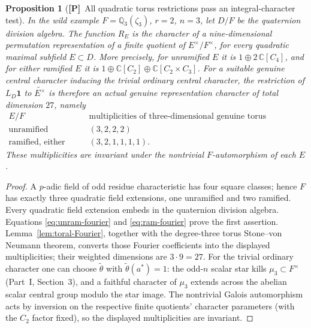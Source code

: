 \documentclass[11pt]{article}
\newcommand{\Q}{\mathbb Q}
\newcommand{\tth}{\widetilde\theta}
\newcommand{\Ptag}{\textnormal{\textbf{[P]}}}
\theoremstyle{plain}
\newtheorem{proposition}[theorem]{Proposition}
\theoremstyle{definition}
\begin{document}
\begin{proposition}[\Ptag\ All quadratic torus restrictions pass
an integral-character test]\label{prop:all-three-tori}
In the wild example $F=\Q_3(\zeta_3)$, $r=2$, $n=3$,
let $D/F$ be the quaternion division algebra.  The function
$R_E$ is the character of a nine-dimensional permutation
representation of a finite quotient of $E^\times/F^\times$,
for every quadratic maximal subfield $E\subset D$.
More precisely, for unramified $E$ it is
$1\oplus 2\,\mathbb C[C_4]$, and for either ramified $E$
it is $1\oplus\mathbb C[C_2]\oplus\mathbb C[C_2\times C_3]$.
For a suitable genuine central character inducing the trivial
ordinary central character, the restriction of $L_D\mathbf1$
to $\widetilde{E^\times}$ is therefore an \emph{actual genuine
representation character} of total dimension $27$, namely
\[
 \begin{array}{c|c}
 E/F&\text{multiplicities of three-dimensional genuine torus irreducibles}\\\hline
 \text{unramified}&(3,2,2,2)\\
 \text{ramified, either type}&(3,2,1,1,1,1).
 \end{array}
\]
These multiplicities are invariant under the nontrivial
$F$-automorphism of each $E$.
\end{proposition}
\begin{proof}
A $p$-adic field of odd residue characteristic has four
square classes; hence $F$ has exactly three quadratic field
extensions, one unramified and two ramified.  Every quadratic
field extension embeds in the quaternion division algebra.
Equations \eqref{eq:unram-fourier} and \eqref{eq:ram-fourier}
prove the first assertion.  Lemma~\ref{lem:toral-Fourier},
together with the degree-three torus Stone--von Neumann theorem,
converts those Fourier coefficients into the displayed
multiplicities; their weighted dimensions are $3\cdot9=27$.
For the trivial ordinary character one can choose
$\tth$ with $\tth(a^*)=1$:
the odd-$n$ scalar star kills $\mu_3\subset F^\times$
(Part~I, Section~3), and a faithful character of
$\mu_3$ extends across the abelian scalar central group
modulo the star image.  The nontrivial Galois automorphism
acts by inversion on the respective finite quotients' character
parameters (with the $C_2$ factor fixed), so the displayed
multiplicities are invariant.
\end{proof}
\end{document}

